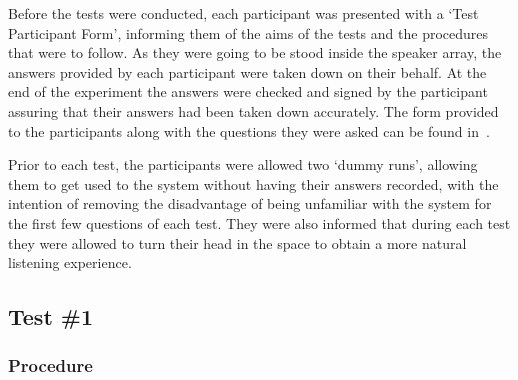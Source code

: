 \documentclass[../../main.tex]{subfiles}
\begin{document}
		

		 	\vspace{5mm}

			Before the tests were conducted, each participant was presented with a `Test Participant Form', informing them of the aims of the tests and the procedures that were to follow. As they were going to be stood inside the speaker array, the answers provided by each participant were taken down on their behalf. At the end of the experiment the answers were checked and signed by the participant assuring that their answers had been taken down accurately. The form provided to the participants along with the questions they were asked can be found in~.

			Prior to each test, the participants were allowed two `dummy runs', allowing them to get used to the system without having their answers recorded, with the intention of removing the disadvantage of being unfamiliar with the system for the first few questions of each test. They were also informed that during each test they were allowed to turn their head in the space to obtain a more natural listening experience.


	\subsection{Test \#1}

		\subsubsection{Procedure}
\end{document}
